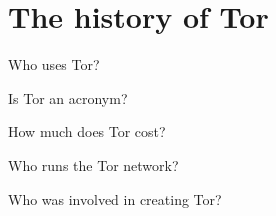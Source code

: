 \documentclass{exam}
\begin{document}
\section{The history of Tor}
\begin{questions}


\question Who uses Tor? 

\begin{solutionorlines}[1in]
\end{solutionorlines}

\question Is Tor an acronym? 
\begin{solutionorlines}[1in]
\end{solutionorlines}

\question How much does Tor cost?
\begin{solutionorlines}[1in]
\end{solutionorlines}

\question Who runs the Tor network? 
\begin{solutionorlines}[1in]
\end{solutionorlines}

\question Who was involved in creating Tor?
\begin{solutionorlines}[1in]
\end{solutionorlines}

\end{questions}
\end{document}
